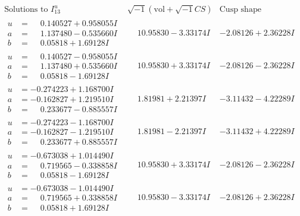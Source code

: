 \documentclass[1p]{elsarticle_modified}
\theoremstyle{definition}
\newcommand{\I}{\sqrt{-1}}
\begin{document}
$$\begin{array}{c|c|c}  
\text{Solutions to }I^u_{13}& \I (\text{vol} + \sqrt{-1}CS) & \text{Cusp shape}\\
 \hline 
\begin{aligned}
u &= \phantom{-}0.140527 + 0.958055 I \\
a &= \phantom{-}1.137480 - 0.535660 I \\
b &= \phantom{-}0.05818 + 1.69128 I\end{aligned}
 & \phantom{-}10.95830 - 3.33174 I & -2.08126 + 2.36228 I \\ \hline\begin{aligned}
u &= \phantom{-}0.140527 - 0.958055 I \\
a &= \phantom{-}1.137480 + 0.535660 I \\
b &= \phantom{-}0.05818 - 1.69128 I\end{aligned}
 & \phantom{-}10.95830 + 3.33174 I & -2.08126 - 2.36228 I \\ \hline\begin{aligned}
u &= -0.274223 + 1.168700 I \\
a &= -0.162827 + 1.219510 I \\
b &= \phantom{-}0.233677 - 0.885557 I\end{aligned}
 & \phantom{-}1.81981 + 2.21397 I & -3.11432 - 4.22289 I \\ \hline\begin{aligned}
u &= -0.274223 - 1.168700 I \\
a &= -0.162827 - 1.219510 I \\
b &= \phantom{-}0.233677 + 0.885557 I\end{aligned}
 & \phantom{-}1.81981 - 2.21397 I & -3.11432 + 4.22289 I \\ \hline\begin{aligned}
u &= -0.673038 + 1.014490 I \\
a &= \phantom{-}0.719565 - 0.338858 I \\
b &= \phantom{-}0.05818 - 1.69128 I\end{aligned}
 & \phantom{-}10.95830 + 3.33174 I & -2.08126 - 2.36228 I \\ \hline\begin{aligned}
u &= -0.673038 - 1.014490 I \\
a &= \phantom{-}0.719565 + 0.338858 I \\
b &= \phantom{-}0.05818 + 1.69128 I\end{aligned}
 & \phantom{-}10.95830 - 3.33174 I & -2.08126 + 2.36228 I \\ \hline\begin{aligned}

\end{aligned}
\end{array}$$
\end{document}
